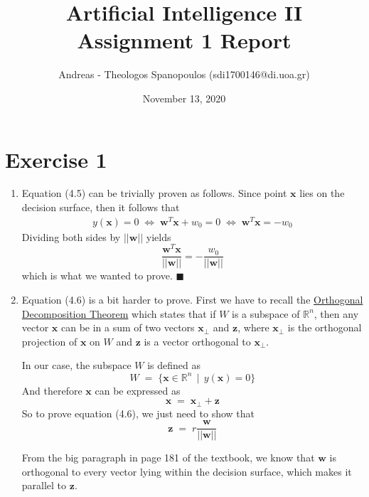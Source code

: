 \documentclass[12pt]{report}
\title{Artificial Intelligence II \\ Assignment 1 Report}
\author{Andreas - Theologos Spanopoulos (sdi1700146@di.uoa.gr)}
\date{November 13, 2020}
\newcommand*{\QEDA}{\hfill\ensuremath{\blacksquare}}
\begin{document}
\maketitle

\section*{Exercise 1}
\begin{enumerate}
    \item Equation (4.5) can be trivially proven as follows. Since point $\textbf{x}$ lies
        on the decision surface, then it follows that
        \begin{align*}
            y(\textbf{x}) = 0 \;\Leftrightarrow\; \textbf{w}^T\textbf{x} + w_0 = 0 \;\Leftrightarrow\;
            \textbf{w}^T\textbf{x} = -w_0
        \end{align*}
        Dividing both sides by $||\textbf{w}||$ yields $$\frac{\textbf{w}^T\textbf{x}}{||\textbf{w}||}
        = -\frac{w_0}{||\textbf{w}||}$$
        which is what we wanted to prove. \QEDA
        \smallskip

    \item Equation (4.6) is a bit harder to prove. First we have to recall the
        \href{https://mathworld.wolfram.com/OrthogonalDecomposition.html}{Orthogonal
        Decomposition Theorem} which states that if $W$ is a subspace of $\mathbb{R}^n$, then any
        vector $\textbf{x}$ can be  in a sum of two vectors
        $\textbf{x}_{\perp}$ and $\textbf{z}$, where $\textbf{x}_{\perp}$ is the
        orthogonal projection of $\textbf{x}$ on $W$ and $\textbf{z}$ is a vector orthogonal
        to $\textbf{x}_{\perp}$.

        In our case, the subspace $W$ is defined as
        $$W \;=\; \{\textbf{x} \in \mathbb{R}^n\;\,|\;\, y(\textbf{x}) = 0\}$$
        And therefore $\textbf{x}$ can be expressed as
        $$\textbf{x} \;=\; \textbf{x}_{\perp} + \textbf{z}$$
        So to prove equation (4.6), we just need to show that
        \begin{equation}
            \textbf{z} \;=\; r \frac{\textbf{w}}{||\textbf{w}||}  
        \end{equation}

        From the big paragraph in page 181 of the 
        textbook, we know that $\textbf{w}$ is orthogonal to every vector lying within the decision
        surface, which makes it parallel to $\textbf{z}$.


\end{enumerate}
\end{document}
